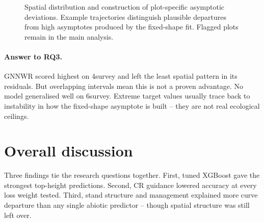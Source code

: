 \begin{figure}[!htbp]
\centering
{}
\caption{Spatial distribution and construction of plot-specific asymptotic deviations. Example
trajectories distinguish plausible departures from high asymptotes produced by the fixed-shape
fit. Flagged plots remain in the main analysis.}
\label{fig:rq3-deviation-examples}
\end{figure}


\paragraph*{Answer to RQ3.}
GNNWR scored highest on 4survey and left the least spatial pattern in its residuals. But
overlapping intervals mean this is not a proven advantage. No model generalised well on 6survey.
Extreme target values usually trace back to instability in how the fixed-shape asymptote is built
-- they are not real ecological ceilings.


\section{Overall discussion}
\label{sec:results-overall-discussion}

Three findings tie the research questions together. First, tuned XGBoost gave the strongest
top-height predictions. Second, CR guidance lowered accuracy at every loss weight tested. Third,
stand structure and management explained more curve departure than any single abiotic predictor
-- though spatial structure was still left over.

